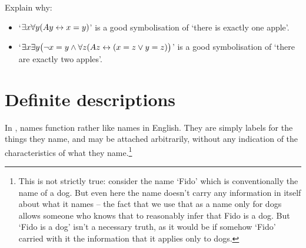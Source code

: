 


\problempart Explain why:
	\begin{itemize}
		\item   `$\exists x \forall y(Ay \leftrightarrow x= y)$' is a good symbolisation of `there is exactly one apple'.
		\item `$\exists x \exists y \bigl(\neg x = y \wedge \forall z(Az \leftrightarrow (x= z \vee y = z) \bigr)$' is a good symbolisation of `there are exactly two apples'.
	\end{itemize}		


\chapter{Definite descriptions}\label{subsec.defdesc}
In \FOL, names function rather like names in English. They are simply labels for the things they name, and may be attached arbitrarily, without any indication of the characteristics of what they name.\footnote{This is not strictly true: consider the name `Fido' which is conventionally the name of a dog. But even here the name doesn't carry any information in itself about what it names – the fact that we use that as a name only for dogs allows someone who knows that to reasonably infer that Fido is a dog. But `Fido is a dog' isn't a necessary truth, as it would be if somehow `Fido' carried with it the information that it applies only to dogs.} 

